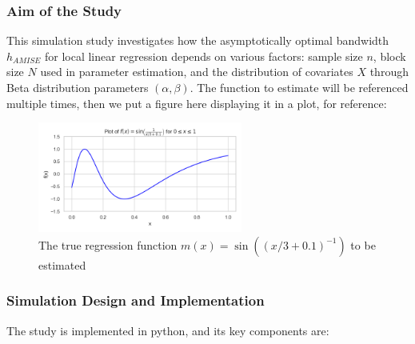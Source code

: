 \documentclass{article}
\begin{document}
\subsubsection*{Aim of the Study}
This simulation study investigates how the asymptotically optimal bandwidth $h_{AMISE}$ for local linear regression depends on various factors: sample size $n$, block size $N$ used in parameter estimation, and the distribution of covariates $X$ through Beta distribution parameters $(\alpha, \beta)$.
The function to estimate will be referenced multiple times, then we put a figure here displaying it in a plot, for reference:
\begin{figure}[H]
\centering
\includegraphics[width=0.6\textwidth]{real_y.png}
\caption{The true regression function $m(x) = \sin\left((x/3 + 0.1)^{-1}\right)$ to be estimated}
\label{fig:y_real}
\end{figure}

\subsubsection*{Simulation Design and Implementation}
The study is implemented in python, and its key components are:
\end{document}
